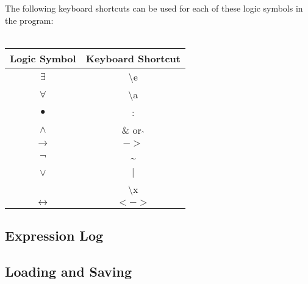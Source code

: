 \documentclass{article}
\begin{document}
	The following keyboard shortcuts can be used for each of these logic symbols in the program: \\ \\
	
		\begin{tabular}{ |c|c| } 
			\hline
			\textbf{Logic Symbol} & \textbf{Keyboard Shortcut} \\ 
			\hline
			$\exists$ & \textbackslash e \\
			\hline 
			$\forall$ & \textbackslash a \\ 
			\hline		
			$\bullet$ & : \\ 
			\hline	
			$\land$ & \& or $\hat{}$ \\ 
			\hline	
			$\rightarrow$ & $->$ \\ 
			\hline	
			$\lnot$ & \textasciitilde \\ 
			\hline	
			$\lor$ & $|$ \\ 
			\hline
			 & \textbackslash x \\ 
			\hline
			$\leftrightarrow$ & $<->$ \\ 
			\hline
		\end{tabular}
		
	\subsection{Expression Log}
	
	\subsection{Loading and Saving}
	
	
	
	
\end{document}
